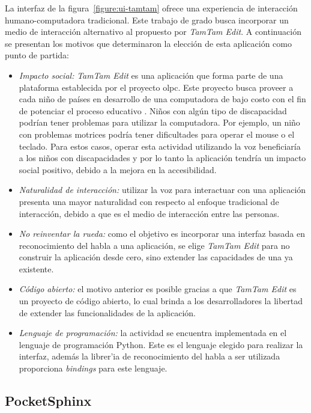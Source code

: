 La interfaz de la figura~\ref{figure:ui-tamtam} ofrece una experiencia de interacci\'on humano-computadora tradicional. 
Este trabajo de grado busca incorporar un medio de interacci\'on alternativo al propuesto por \emph{TamTam Edit}. 
A continuaci\'on se presentan los motivos que determinaron la elecci\'on de esta aplicaci\'on como punto de partida:

\begin{itemize}
    \item \emph{Impacto social:} \emph{TamTam Edit} es una aplicaci\'on que forma parte de una plataforma establecida
    por el proyecto \gls{olpc}. Este proyecto busca proveer
	a cada ni\~no de pa\'ises en desarrollo de una computadora de bajo costo con el
	fin de potenciar el proceso educativo \cite{OLPC}. Ni\~nos con alg\'un tipo de discapacidad podr\'ian tener
	problemas para utilizar la computadora. Por ejemplo, un ni\~no con problemas motrices podr\'ia tener dificultades para operar el mouse
	o el teclado. Para estos casos, operar esta actividad utilizando la voz beneficiar\'ia a los ni\~nos con discapacidades
	y por lo tanto la aplicaci\'on tendr\'ia un impacto social positivo, debido a la mejora en la accesibilidad.
    \item \emph{Naturalidad de interacci\'on:} utilizar la voz para interactuar con una aplicaci\'on presenta una mayor
	naturalidad con respecto al enfoque tradicional de interacci\'on, debido a que es el medio de
	interacci\'on entre las personas.
    \item \emph{No reinventar la rueda:} como el objetivo es incorporar una interfaz basada en reconocimiento del habla a una aplicaci\'on,
	se elige \emph{TamTam Edit} para no construir la aplicaci\'on desde cero, sino extender las capacidades de una ya existente.
    \item \emph{C\'odigo abierto:} el motivo anterior es posible gracias a que \emph{TamTam Edit} es un proyecto de c\'odigo abierto, lo cual
	brinda a los desarrolladores la libertad de extender las funcionalidades de la aplicaci\'on.
    \item \emph{Lenguaje de programaci\'on:} la actividad se encuentra implementada en el lenguaje de programaci\'on Python. Este es el
	lenguaje elegido para realizar la interfaz, adem\'as la librer'ia de reconocimiento del habla a ser utilizada proporciona
        \emph{bindings} para este lenguaje.
\end{itemize}



\subsection{PocketSphinx}

